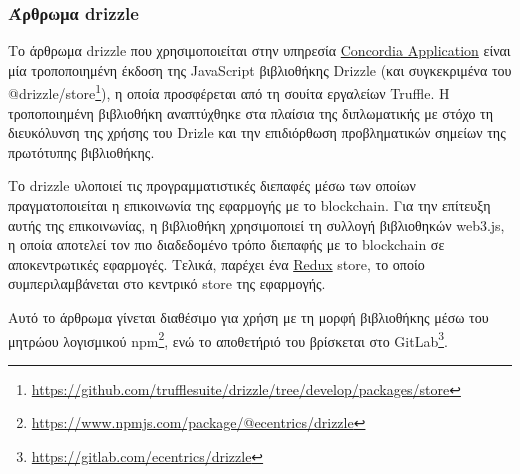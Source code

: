 \subsubsection{Άρθρωμα drizzle} \label{subsubsection:4-3-1-4-drizzle-module}

Το άρθρωμα drizzle που χρησιμοποιείται στην υπηρεσία \hyperref[subsection:4-3-2-concordia-application-service]{Concordia Application} είναι μία τροποποιημένη έκδοση της JavaScript βιβλιοθήκης Drizzle (και συγκεκριμένα του @drizzle/store\footnote{\url{https://github.com/trufflesuite/drizzle/tree/develop/packages/store}}), η οποία προσφέρεται από τη σουίτα εργαλείων Truffle. Η τροποποιημένη βιβλιοθήκη αναπτύχθηκε στα πλαίσια της διπλωματικής με στόχο τη διευκόλυνση της χρήσης του Drizle και την επιδιόρθωση προβληματικών σημείων της πρωτότυπης βιβλιοθήκης.

Το drizzle υλοποιεί τις προγραμματιστικές διεπαφές μέσω των οποίων πραγματοποιείται η επικοινωνία της εφαρμογής με το blockchain. Για την επίτευξη αυτής της επικοινωνίας, η βιβλιοθήκη χρησιμοποιεί τη συλλογή βιβλιοθηκών web3.js, η οποία αποτελεί τον πιο διαδεδομένο τρόπο διεπαφής με το blockchain σε αποκεντρωτικές εφαρμογές. Τελικά, παρέχει ένα \hyperref[subsection:4-2-2-2-redux]{Redux} store, το οποίο συμπεριλαμβάνεται στο κεντρικό store της εφαρμογής.

Αυτό το άρθρωμα γίνεται διαθέσιμο για χρήση με τη μορφή βιβλιοθήκης μέσω του μητρώου λογισμικού npm\footnote{\url{https://www.npmjs.com/package/@ecentrics/drizzle}}, ενώ το αποθετήριό του βρίσκεται στο GitLab\footnote{\url{https://gitlab.com/ecentrics/drizzle}}.